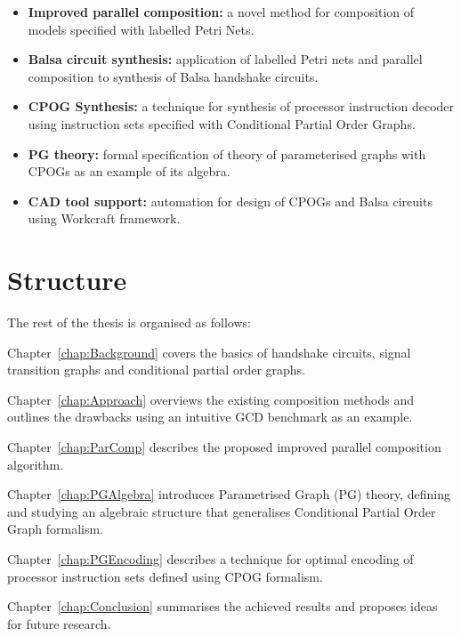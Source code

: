 \begin{itemize}
\item
\textbf{Improved parallel composition:} a novel method for composition of models specified with labelled Petri Nets.

\item
\textbf{Balsa circuit synthesis:} application of labelled Petri nets and parallel composition to synthesis of Balsa handshake circuits.

\item
\textbf{CPOG Synthesis:} a technique for synthesis of processor instruction decoder using instruction sets specified with Conditional Partial Order Graphs.

\item
\textbf{PG theory:} formal specification of theory of parameterised graphs with CPOGs as an example of its algebra.

\item
\textbf{CAD tool support:} automation for design of CPOGs and Balsa circuits using Workcraft framework.

\end{itemize}

\section{Structure}

The rest of the thesis is organised as follows:

Chapter~\ref{chap:Background} covers the basics of handshake circuits, signal transition graphs and conditional partial order graphs.

Chapter~\ref{chap:Approach} overviews the existing composition methods and outlines the drawbacks using an intuitive GCD benchmark as an example.

Chapter~\ref{chap:ParComp} describes the proposed improved parallel composition algorithm.

Chapter~\ref{chap:PGAlgebra} introduces Parametrised Graph (PG) theory, defining and studying an algebraic structure that generalises Conditional Partial Order Graph formalism.

Chapter~\ref{chap:PGEncoding} describes a technique for optimal encoding of processor instruction sets defined using CPOG formalism.

Chapter~\ref{chap:Conclusion} summarises the achieved results and proposes ideas for future research.





